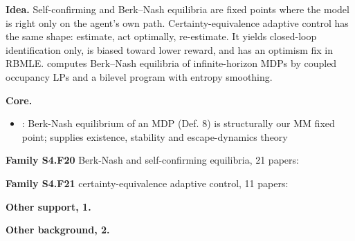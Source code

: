 \documentclass[10pt]{article}
\newcommand{\memb}[1]{\par\smallskip\textbf{#1}\quad}
\begin{document}
\textbf{Idea.} Self-confirming and Berk--Nash equilibria are fixed points where the model is right only on the agent's own path. Certainty-equivalence adaptive control has the same shape: estimate, act optimally, re-estimate. It yields closed-loop identification only, is biased toward lower reward, and has an optimism fix in RBMLE. \citet{Zhu-mathematical26} computes Berk--Nash equilibria of infinite-horizon MDPs by coupled occupancy LPs and a bilevel program with entropy smoothing.

\memb{Core.}
\begin{itemize}[nosep,leftmargin=1.2em]
\item \citet{Esponda-equilibrium21}: Berk-Nash equilibrium of an MDP (Def. 8) is structurally our MM fixed point; supplies existence, stability and escape-dynamics theory
\end{itemize}
\memb{Family S4.F20} Berk-Nash and self-confirming equilibria, 21 papers: {\footnotesize \citetext{\citealp{Esponda-equilibrium21}; \citealp{Fudenberg-selfconfirming93}; \citealp{Esponda-berknash16}; \citealp{Zhu-mathematical26}; \citealp{Fudenberg-learning95}; \citealp{Cho-escaping02}; \citealp{Fudenberg-superstition06}; \citealp{Battigalli-selfconfirming15}; \citealp{Frick-stability20}; \citealp{Fudenberg-stability20}; \citealp{Esponda-asymptotic21}; \citealp{Fudenberg-limit21}; \citealp{Anderson-existence22}; \citealp{Frick-belief22}; \citealp{BaGindin-multiagent23}; \citealp{Fudenberg-pathwise23}; \citealp{Fudenberg-which23}; \citealp{Bohren-misspecified25}; \citealp{Esponda-berknash25}; \citealp{HeLibgober-misspecified25}; \citealp{Xu-epistemic26}}}

\memb{Family S4.F21} certainty-equivalence adaptive control, 11 papers: {\footnotesize \citetext{\citealp{Keskin-incomplete18}; \citealp{Mete-reward21}; \citealp{BarShalom-dual74}; \citealp{Borkar-adaptive79}; \citealp{Kumar-new82}; \citealp{Kumar-optimal82}; \citealp{Lai-iterated82}; \citealp{Harrison-bayesian12}; \citealp{denBoer-simultaneously14}; \citealp{Mania-certainty19}; \citealp{Simchowitz-naive20}}}

\memb{Other support, 1.} \citetext{\citealp{Tschantz-learning20}}

\memb{Other background, 2.} {\footnotesize \citetext{\citealp{Ljung-analysis77}; \citealp{Kushner-stochastic97}}}
\end{document}
